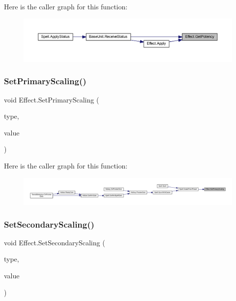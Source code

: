 Here is the caller graph for this function\+:\nopagebreak
\begin{figure}[H]
\begin{center}
\leavevmode
\includegraphics[width=350pt]{class_effect_a5af13ce8f65df2bfbba422a46e627fc0_icgraph}
\end{center}
\end{figure}
\mbox{\label{class_effect_a5c751c4432cf967c74fe16befbdbbe2e}} 
\subsubsection{\texorpdfstring{SetPrimaryScaling()}{SetPrimaryScaling()}}
{\footnotesize\ttfamily void Effect.\+Set\+Primary\+Scaling (\begin{DoxyParamCaption}\item[{\mbox{\hyperlink{class_effect_af0ada789de40f58c24c46bf8ed2f300c}{Scaling\+Type}}}]{type,  }\item[{float}]{value }\end{DoxyParamCaption})}

Here is the caller graph for this function\+:\nopagebreak
\begin{figure}[H]
\begin{center}
\leavevmode
\includegraphics[width=350pt]{class_effect_a5c751c4432cf967c74fe16befbdbbe2e_icgraph}
\end{center}
\end{figure}
\mbox{\label{class_effect_a476b569a5adf97f1b691dcbb7e5cb325}} 
\subsubsection{\texorpdfstring{SetSecondaryScaling()}{SetSecondaryScaling()}}
{\footnotesize\ttfamily void Effect.\+Set\+Secondary\+Scaling (\begin{DoxyParamCaption}\item[{\mbox{\hyperlink{class_effect_af0ada789de40f58c24c46bf8ed2f300c}{Scaling\+Type}}}]{type,  }\item[{float}]{value }\end{DoxyParamCaption})}

